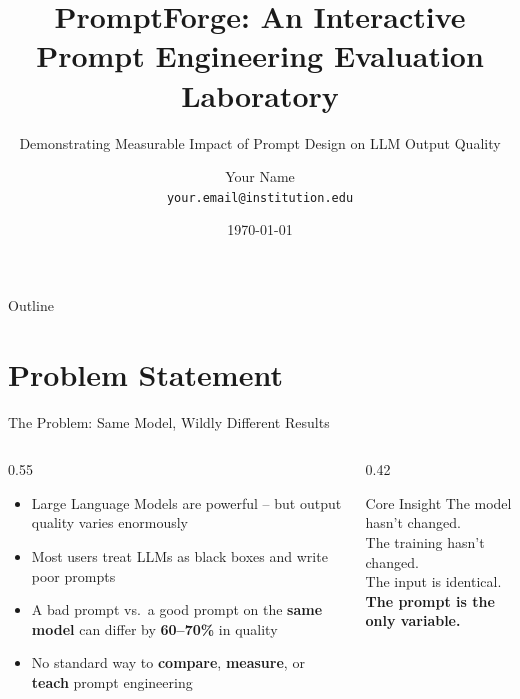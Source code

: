 \documentclass[aspectratio=169, 12pt]{beamer}
\title[PromptForge]{PromptForge: An Interactive Prompt Engineering Evaluation Laboratory}
\subtitle{Demonstrating Measurable Impact of Prompt Design on LLM Output Quality}
\author[Your Name]{Your Name \\ \texttt{your.email@institution.edu}}
\institute{Department of Computer Science \\ Your Institution}
\date{\today}
\begin{document}

\begin{frame}
  \titlepage
\end{frame}

\begin{frame}{Outline}
  \tableofcontents
\end{frame}

\section{Problem Statement}

\begin{frame}{The Problem: Same Model, Wildly Different Results}
  \begin{columns}[T]
    \begin{column}{0.55\textwidth}
      \begin{itemize}
        \setlength\itemsep{0.6em}
        \item Large Language Models are powerful -- but output quality varies enormously
        \item Most users treat LLMs as black boxes and write poor prompts
        \item A bad prompt vs.\ a good prompt on the \textbf{same model} can differ
              by \textcolor{pfblue}{\textbf{60--70\%}} in quality
        \item No standard way to \textbf{compare}, \textbf{measure},
              or \textbf{teach} prompt engineering
      \end{itemize}
    \end{column}
    \begin{column}{0.42\textwidth}
      \begin{block}{Core Insight}
        The model hasn't changed.\\
        The training hasn't changed.\\
        The input is identical.\\[0.5em]
        \textbf{The prompt is the only variable.}
      \end{block}
    \end{column}
  \end{columns}
\end{frame}
\end{document}
